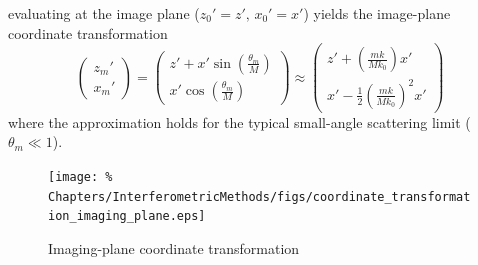 evaluating at the image plane ($z_0' = z', \, x_0' = x'$)
yields the image-plane coordinate transformation
\begin{equation}
  \begin{pmatrix}
    z_m' \\
    x_m'
  \end{pmatrix}
  =
  \begin{pmatrix}
    z' + x' \sin\left( \frac{\theta_m}{M} \right) \\
    x' \cos\left( \frac{\theta_m}{M} \right)
  \end{pmatrix}
  \approx
  \begin{pmatrix}
    z' + \left( \frac{m k}{M k_0} \right) x' \\
    x' - \frac{1}{2} \left( \frac{m k}{M k_0} \right)^2 x'
  \end{pmatrix}
  \label{eq:InterferometricMethods:coordinate_transformation_imaging_plane}
\end{equation}
where the approximation holds for
the typical small-angle scattering limit ($\theta_m \ll 1$).

\begin{figure}
  \centering
  \texttt{[image: \%
    Chapters/InterferometricMethods/figs/coordinate\_transformation\_imaging\_plane.eps]}
  \caption[Imaging-plane coordinate transformation]{%
    Imaging-plane coordinate transformation}
\label{fig:InterferometricMethods:coordinate_transformation_imaging_plane}
\end{figure}

